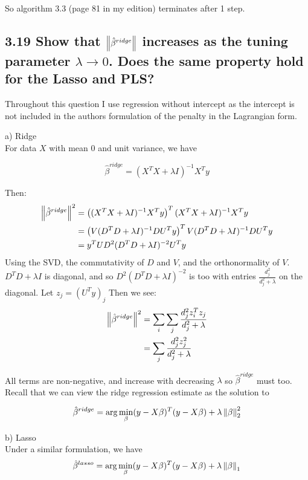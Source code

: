 So algorithm 3.3 (page 81 in my edition) terminates after 1 step.






\subsection*{3.19 Show that $\left\lVert\hat{\beta}^{ridge}\right\rVert$ increases as the tuning parameter $\lambda \rightarrow 0$. Does the same property hold for the Lasso and PLS?}

Throughout this question I use regression without intercept as the intercept is not included in the authors formulation of the penalty in the Lagrangian form.

a) Ridge\\
For data $X$ with mean 0 and unit variance, we have

$$\hat{\beta}^{ridge} = (X^TX + \lambda I)^{-1}X^T y$$

Then:
\begin{align*}
     \left\lVert\hat{\beta}^{ridge}\right\rVert^2 &= \left((X^TX + \lambda I)^{-1}X^T y\right)^T (X^TX + \lambda I)^{-1}X^T y \\
     &= \left(V (D^TD + \lambda I)^{-1}D U^T y\right)^T V(D^T D + \lambda I)^{-1} D U^T y \\
     &= y^T U D^2 (D^T D + \lambda I)^{-2} U^T y
\end{align*}
Using the SVD, the commutativity of $D$ and $V$, and the orthonormality of $V$.
$D^T D + \lambda I$ is diagonal, and so $D^2 (D^T D + \lambda I)^{-2}$ is too with entries $\frac{d_j^2}{d_j^2 + \lambda}$ on the diagonal.
Let $z_j = (U^T y)_j$
Then we see:
\begin{align*}
\left\lVert\hat{\beta}^{ridge}\right\rVert^2 &= \sum_i \sum_j \frac{d_j^2 z_i^T z_j}{d_j^2 + \lambda}\\
&= \sum_j \frac{d_j^2 z_j^2}{d_j^2 + \lambda}\\
\end{align*} 

All terms are non-negative, and increase with decreasing $\lambda$ so $\hat{\beta}^{ridge}$ must too.
Recall that we can view the ridge regression estimate as the solution to

$$\hat{\beta}^{ridge} = \arg\min_\beta (y - X\beta)^T (y - X \beta) + \lambda \left\lVert\beta\right\rVert_2^2$$

b) Lasso\\

Under a similar formulation, we have 
$$\hat{\beta}^{lasso} = \arg\min_\beta (y - X\beta)^T (y - X \beta) + \lambda \left\lVert\beta\right\rVert_1$$

